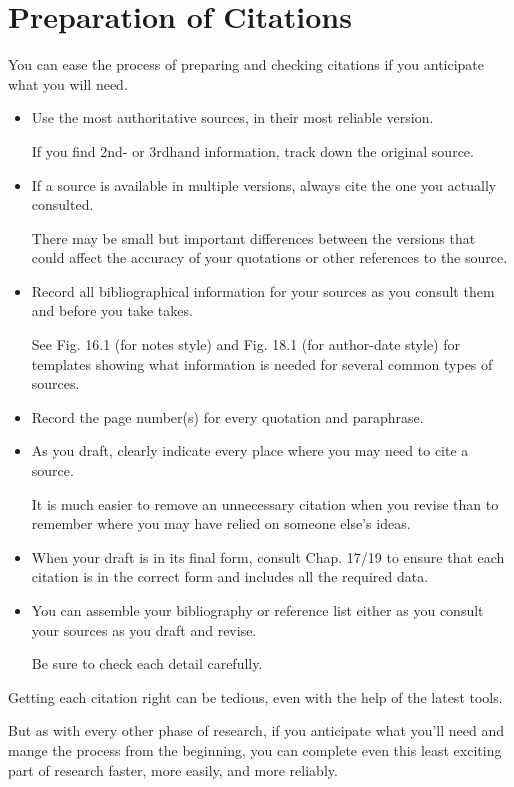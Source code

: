 \documentclass[oneside]{book}
\numberwithin{equation}{section}
\begin{document}
\section{Preparation of Citations}
You can ease the process of preparing and checking citations if you anticipate what you will need.
\begin{itemize}
    \item Use the most authoritative sources, in their most reliable version.
    
    If you find 2nd- or 3rdhand information, track down the original source.
    \item If a source is available in multiple versions, always cite the one you actually consulted.
    
    There may be small but important differences between the versions that could affect the accuracy of your quotations or other references to the source.
    \item Record all bibliographical information for your sources as you consult them and before you take takes.
    
    See Fig. 16.1 (for notes style) and Fig. 18.1 (for author-date style) for templates showing what information is needed for several common types of sources.
    \item Record the page number(s) for every quotation and paraphrase.
    \item As you draft, clearly indicate every place where you may need to cite a source.
    
    It is much easier to remove an unnecessary citation when you revise than to remember where you may have relied on someone else's ideas.
    \item When your draft is in its final form, consult Chap. 17/19 to ensure that each citation is in the correct form and includes all the required data.
    \item You can assemble your bibliography or reference list either as you consult your sources as you draft and revise.
    
    Be sure to check each detail carefully.
\end{itemize}
Getting each citation right can be tedious, even with the help of the latest tools.

But as with every other phase of research, if you anticipate what you'll need and mange the process from the beginning, you can complete even this least exciting part of research faster, more easily, and more reliably.
\end{document}
